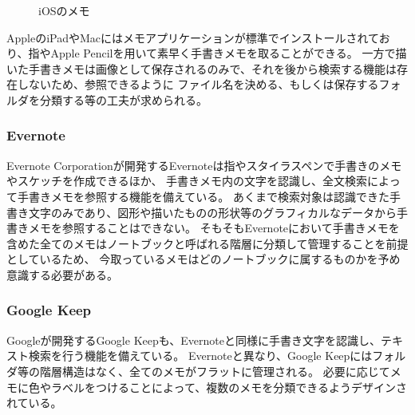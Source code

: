 \begin{figure}[htbp]
    \begin{center}
         \end{center}
    \caption{iOSのメモ}
\end{figure}

AppleのiPadやMacにはメモアプリケーションが標準でインストールされており、指やApple Pencilを用いて素早く手書きメモを取ることができる。
一方で描いた手書きメモは画像として保存されるのみで、それを後から検索する機能は存在しないため、参照できるように
ファイル名を決める、もしくは保存するフォルダを分類する等の工夫が求められる。

\subsubsection{Evernote}

Evernote Corporationが開発するEvernoteは指やスタイラスペンで手書きのメモやスケッチを作成できるほか、
手書きメモ内の文字を認識し、全文検索によって手書きメモを参照する機能を備えている。
あくまで検索対象は認識できた手書き文字のみであり、図形や描いたものの形状等のグラフィカルなデータから手書きメモを参照することはできない。
そもそもEvernoteにおいて手書きメモを含めた全てのメモはノートブックと呼ばれる階層に分類して管理することを前提としているため、
今取っているメモはどのノートブックに属するものかを予め意識する必要がある。

\subsubsection{Google Keep}

Googleが開発するGoogle Keepも、Evernoteと同様に手書き文字を認識し、テキスト検索を行う機能を備えている。
Evernoteと異なり、Google Keepにはフォルダ等の階層構造はなく、全てのメモがフラットに管理される。
必要に応じてメモに色やラベルをつけることによって、複数のメモを分類できるようデザインされている。

